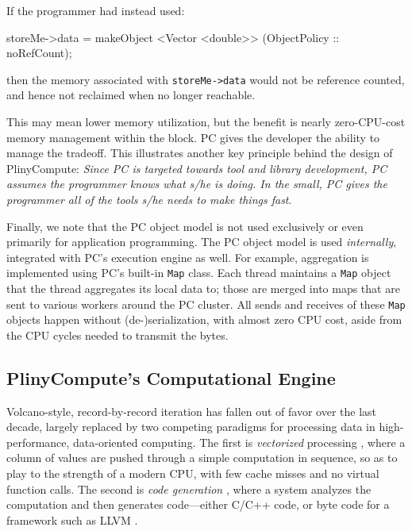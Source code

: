 If the 
programmer had instead used: 

\begin{code}
storeMe->data = makeObject <Vector <double>> (ObjectPolicy :: noRefCount);
\end{code}


\noindent then the memory associated with \texttt{storeMe->data} would
not be reference counted, and hence not reclaimed when no longer
reachable.  

This may mean lower memory utilization,
but the benefit is nearly zero-CPU-cost memory management within the block.
PC gives the developer the ability to manage the tradeoff.
This illustrates another key principle behind the design of
PlinyCompute: \emph{Since PC is targeted towards tool and library
  development, PC assumes the programmer knows what s/he is doing.  In
  the small, PC gives the programmer all of the tools s/he needs to make things fast}.

Finally, we note that the PC object model is not used exclusively or
even primarily for application programming.  The PC object model
is used \emph{internally}, integrated with PC's execution engine as well.
For example, aggregation is implemented using PC's built-in
\texttt{Map} class.  Each thread maintains
a \texttt{Map} object that the thread aggregates its local data to; those are
merged into maps that are sent to various workers around the PC
cluster.  All sends and receives of these \texttt{Map} objects happen
without (de-)serialization, with almost zero CPU cost, aside from the CPU
cycles needed to transmit the bytes.



\subsection{PlinyCompute's Computational Engine}
\label{sec:engine}

Volcano-style, record-by-record iteration \cite{graefe1990encapsulation} has fallen out of favor over the last decade, largely replaced by
two competing paradigms for processing data
in high-performance, data-oriented computing.  The first is \emph{vectorized} processing \cite{abadi2009column, boncz2005monetdb, zukowski2005monetdb, idreos2012monetdb}, where a column of values are pushed
through a simple computation in sequence, so as to play to the strength of a modern CPU, with few cache misses and no virtual
function calls.  The second is \emph{code generation} \cite{neumann2011efficiently, nagel2014code, bress2017generating, klonatos2014building, ahmad2009dbtoaster}, where a system analyzes the computation
and then generates code---either C/C++ code, or byte code for a framework such as LLVM \cite{lattner2004llvm, lattner2002llvm}.

